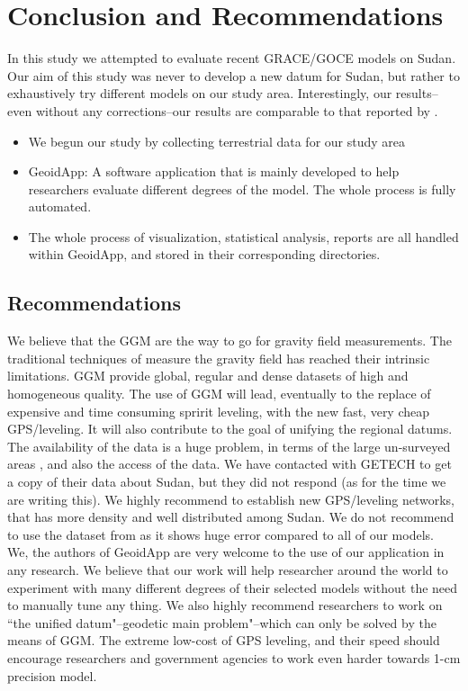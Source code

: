 \chapter{Conclusion and Recommendations}
\label{Chapter6}

In this study we attempted to evaluate recent GRACE/GOCE models on Sudan. Our aim of this study was never to develop a new datum for Sudan, but rather to exhaustively try different models on our study area. Interestingly, our results--even without any corrections--our results are comparable to that reported by \citep{ahmed_msc, godah}. 

\begin{itemize}
	\item We begun our study by collecting terrestrial data for our study area
	\item GeoidApp: A software application that is mainly developed to help researchers evaluate different degrees of the model. The whole process is fully automated.
	\item The whole process of visualization, statistical analysis, reports are all handled within GeoidApp, and stored in their corresponding directories.
\end{itemize}

\section{Recommendations}

We believe that the GGM are the way to go for gravity field measurements. The traditional techniques of measure the gravity field has reached their intrinsic limitations. GGM provide global, regular and dense datasets of high and homogeneous quality. The use of GGM will lead, eventually to the replace of expensive and time consuming spririt leveling, with the new fast, very cheap GPS/leveling. It will also contribute to the goal of unifying the regional datums.
\\
The availability of the data is a huge problem, in terms of the large un-surveyed areas \citep{ahmed_msc, godah}, and also the access of the data. We have contacted with GETECH to get a copy of their data about Sudan, but they did not respond (as for the time we are writing this). We highly recommend to establish new GPS/leveling networks, that has more density and well distributed among Sudan. We do not recommend to use the dataset from \citep{osman} as it shows huge error compared to all of our models. 
\\
We, the authors of GeoidApp are very welcome to the use of our application in any research. We believe that our work will help researcher around the world to experiment with many different degrees of their selected models without the need to manually tune any thing. We also highly recommend researchers to work on ``the unified datum"--geodetic main problem"--which can only be solved by the means of GGM. The extreme low-cost of GPS leveling, and their speed should encourage researchers and government agencies to work even harder towards 1-cm precision model. 